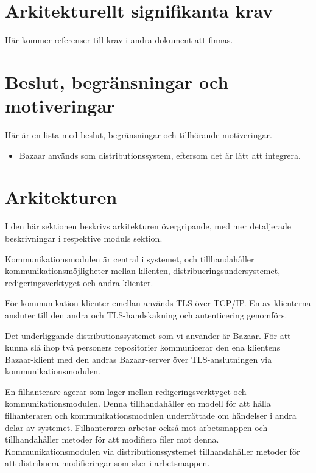 \section{Arkitekturellt signifikanta krav}
Här kommer referenser till krav i andra dokument att finnas.
\section{Beslut, begränsningar och motiveringar}
Här är en lista med beslut, begränsningar och tillhörande motiveringar.
\begin{itemize}
\item Bazaar används som distributionssystem, eftersom det är lätt att integrera.
\end{itemize}
\section{Arkitekturen}
I den här sektionen beskrivs arkitekturen övergripande, med mer
detaljerade beskrivningar i respektive moduls sektion.

Kommunikationsmodulen är central i systemet, och tillhandahåller
kommunikationsmöjligheter mellan klienten,
distribueringsundersystemet, redigeringsverktyget och andra klienter.

För kommunikation klienter emellan används TLS över TCP/IP. En av
klienterna ansluter till den andra och TLS-handskakning och
autenticering genomförs.

Det underliggande distributionssystemet som vi använder är Bazaar. För
att kunna slå ihop två personers repositorier kommunicerar den ena
klientens Bazaar-klient med den andras Bazaar-server över
TLS-anslutningen via kommunikationsmodulen.

En filhanterare agerar som lager mellan redigeringsverktyget och
kommunikationsmodulen. Denna tillhandahåller en modell för att hålla
filhanteraren och kommunikationsmodulen underrättade om händelser i
andra delar av systemet. Filhanteraren arbetar också mot arbetsmappen
och tillhandahåller metoder för att modifiera filer mot
denna. Kommunikationsmodulen via distributionssystemet tillhandahåller
metoder för att distribuera modifieringar som sker i arbetsmappen.

